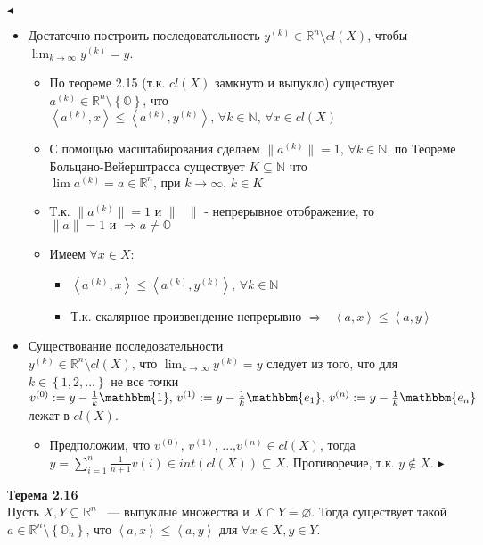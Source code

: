 $\blacktriangleleft$
\begin{itemize}
\item Достаточно построить последовательность $y^{(k)} \in \mathbb{R}^{n} \setminus cl(X)$, чтобы $\lim_{k \rightarrow \infty} y^{(k)} =y$.
\begin{itemize}
\item  По теореме 2.15 (т.к. $cl(X)$ замкнуто и выпукло) существует  $a^{(k)} \in \mathbb{R}^{n} \setminus \left\lbrace \mathbb{O} \right\rbrace$, что  $\left\langle a^{(k)},x \right\rangle \leq \left\langle a^{(k)},y^{(k)} \right\rangle \text{, } \forall k \in \mathbb{N} \text{, } \forall x \in cl(X)$
\item С помощью масштабирования сделаем $\| a^{(k)}\| =1 \text{, } \forall k \in \mathbb{N}$, по Теореме Больцано-Вейерштрасса существует $K \subseteq \mathbb{N}$ что $\lim a^{(k)}=a \in \mathbb{R}^{n} \text{, при } k \rightarrow \infty \text{, } k \in K$
\item Т.к. $\| a^{(k)}\| =1$ и $\| \text{ } \|$ - непрерывное отображение, то $\| a\| =1 \text{ и } \Longrightarrow a \neq \mathbb{O} $
\item Имеем $\forall x \in X$:
\begin{itemize}
\item  $\left\langle a^{(k)},x \right\rangle \leq \left\langle a^{(k)},y^{(k)} \right\rangle \text{, } \forall k \in \mathbb{N}$
\item Т.к. скалярное произвендение непрерывно $\Longrightarrow \text{ } \left\langle a,x \right\rangle \leq \left\langle a,y \right\rangle$
\end{itemize}
\end{itemize}
\item Существование последовательности $y^{(k)} \in \mathbb{R}^{n} \setminus cl(X) \text{, что } \lim_{k \rightarrow \infty} y^{(k)}=y$ следует из того, что для $k \in \left\lbrace 1,2,\text{...}\right\rbrace$ не все точки  $v^{(0)}:=y -\frac{1}{k}\mathbbm{1} \text{, } v^{(1)}:=y -\frac{1}{k}\mathbbm{e_{1}} \text{, } v^{(n)}:=y -\frac{1}{k}\mathbbm{e_{n}}$ лежат в $cl(X)$.
\begin{itemize}
\item Предположим, что $v^{(0)}\text{, }v^{(1)}\text{, ...,}v^{(n)} \in cl(X)$, тогда $\displaystyle y=\sum_{i=1}^{n}\frac{1}{n+1}v{(i)} \in int(cl(X)) \subseteq X$. Противоречие, т.к. $y \notin X$. $\blacktriangleright$
\end{itemize}
\end{itemize}
\noindent\textbf{Терема 2.16}\\
Пусть $X, Y\subseteq \mathbb{R}^n$ ~--- выпуклые множества и $X \cap Y = \varnothing$. Тогда существует такой $a\in\mathbb{R}^n\setminus \left \{ \mathbb{O}_n \right \}$, что \textbf{$\left \langle a,x \right \rangle \leq \left \langle a,y \right \rangle$} для $\forall x\in X, y \in Y$.\\

